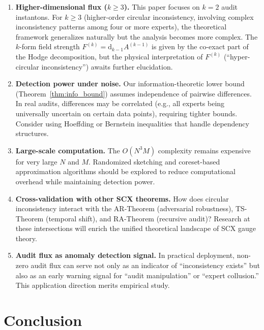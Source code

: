 \documentclass[12pt,a4paper]{article}
\theoremstyle{plain}
\theoremstyle{definition}
\theoremstyle{remark}
\newcommand{\dd}{\mathrm{d}}
\begin{document}
\begin{enumerate}[label=(\arabic*), leftmargin=*]
    \item \textbf{Higher-dimensional flux ($k \geq 3$).} This paper focuses on $k=2$ audit instantons. For $k \geq 3$ (higher-order circular inconsistency, involving complex inconsistency patterns among four or more experts), the theoretical framework generalizes naturally but the analysis becomes more complex. The $k$-form field strength $F^{(k)} = \dd_{k-1} A^{(k-1)}$ is given by the co-exact part of the Hodge decomposition, but the physical interpretation of $F^{(k)}$ (``hyper-circular inconsistency'') awaits further elucidation.
    \item \textbf{Detection power under noise.} Our information-theoretic lower bound (Theorem~\ref{thm:info_bound}) assumes independence of pairwise differences. In real audits, differences may be correlated (e.g., all experts being universally uncertain on certain data points), requiring tighter bounds. Consider using Hoeffding or Bernstein inequalities that handle dependency structures.
    \item \textbf{Large-scale computation.} The $O(N^3 M)$ complexity remains expensive for very large $N$ and $M$. Randomized sketching and coreset-based approximation algorithms should be explored to reduce computational overhead while maintaining detection power.
    \item \textbf{Cross-validation with other SCX theorems.} How does circular inconsistency interact with the AR-Theorem (adversarial robustness), TS-Theorem (temporal shift), and RA-Theorem (recursive audit)? Research at these intersections will enrich the unified theoretical landscape of SCX gauge theory.
    \item \textbf{Audit flux as anomaly detection signal.} In practical deployment, non-zero audit flux can serve not only as an indicator of ``inconsistency exists'' but also as an early warning signal for ``audit manipulation'' or ``expert collusion.'' This application direction merits empirical study.
\end{enumerate}

\section{Conclusion}
\label{sec:conclusion}
\end{document}
